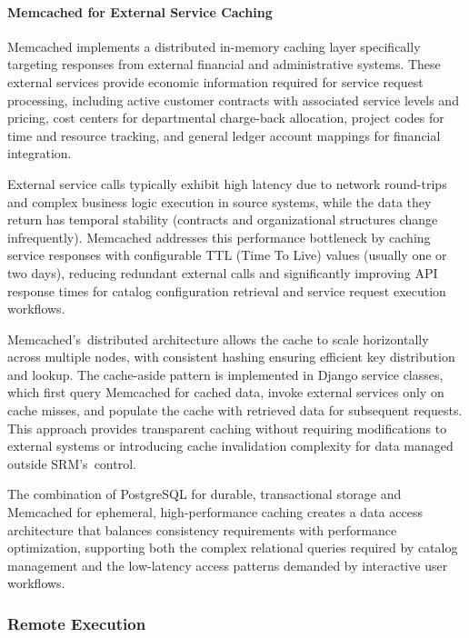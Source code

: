 \paragraph{Memcached for External Service Caching}

Memcached implements a distributed in-memory caching layer specifically targeting responses from external financial and administrative systems. These external services provide economic information required for service request processing, including active customer contracts with associated service levels and pricing, cost centers for departmental charge-back allocation, project codes for time and resource tracking, and general ledger account mappings for financial integration.

External service calls typically exhibit high latency due to network round-trips and complex business logic execution in source systems, while the data they return has temporal stability (contracts and organizational structures change infrequently). Memcached addresses this performance bottleneck by caching service responses with configurable TTL (Time To Live) values (usually one or two days), reducing redundant external calls and significantly improving API response times for catalog configuration retrieval and service request execution workflows.

Memcached's~distributed architecture allows the cache to scale horizontally across multiple nodes, with consistent hashing ensuring efficient key distribution and lookup. The cache-aside pattern is implemented in Django service classes, which first query Memcached for cached data, invoke external services only on cache misses, and populate the cache with retrieved data for subsequent requests. This approach provides transparent caching without requiring modifications to external systems or introducing cache invalidation complexity for data managed outside SRM's~control.

The combination of PostgreSQL for durable, transactional storage and Memcached for ephemeral, high-performance caching creates a data access architecture that balances consistency requirements with performance optimization, supporting both the complex relational queries required by catalog management and the low-latency access patterns demanded by interactive user workflows.

\subsubsection{Remote Execution}

